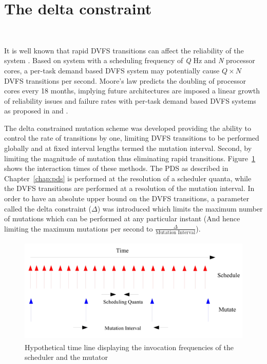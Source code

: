 \section{The delta constraint}~\label{sec:delta_constraint}


It is well known that rapid DVFS transitions can affect the reliability of the system \cite{ImpactDVFS}.
Based on system with a scheduling frequency of \textit{Q} Hz
and \textit{N} processor cores, a per-task demand based DVFS system may potentially cause $Q \times N$ 
DVFS transitions per second. Moore's law predicts the doubling of processor cores every 18 months, implying
future architectures are imposed a linear growth of reliability issues and failure rates with per-task
demand based DVFS systems as proposed in \cite{LiveRuntime} and \cite{Phaseaware}. 

The delta constrained mutation scheme was developed providing the ability to control the rate of transitions
by one, limiting DVFS transitions to be performed globally and at fixed interval lengths termed the mutation
interval. Second, by limiting the magnitude of mutation thus eliminating rapid transitions.
Figure~\ref{fig:schedule_mutate} shows the interaction times of these methods. 
The PDS as described in Chapter~\ref{chap:pds} is performed at the resolution of a scheduler quanta, while
the DVFS transitions are performed at a resolution of the mutation interval. In order to have an absolute
upper bound on the DVFS transitions, a parameter called the delta constraint ($\Delta$) was introduced
which limits the maximum number of mutations which can be performed at any particular instant (And hence
limiting the maximum mutations per second to $\frac{\Delta}{\text{Mutation Interval}}$). 

\begin{figure}[h!]
  \begin{center}
    \includegraphics[height=2in]{figures/Schedule_Mutate.jpg}
    \caption{Hypothetical time line displaying the invocation frequencies of the scheduler and the mutator}
    \label{fig:schedule_mutate}
  \end{center}
\end{figure}



